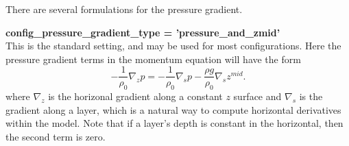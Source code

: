 There are several formulations for the pressure gradient.

{\bf config\_pressure\_gradient\_type = 'pressure\_and\_zmid'}\\
This is the standard setting, and may be used for most configurations.  Here the pressure gradient terms in the momentum equation will have the form
\begin{equation}
\label{ocean:\mode_grad p}
- \frac{1}{\rho_0}\nabla_z p = - \frac{1}{\rho_0}\nabla_s p - \frac{\rho g}{\rho_0}\nabla_s z^{mid}.
\end{equation}
where $\nabla_z$ is the horizonal gradient along a constant $z$ surface and $\nabla_s$ is the gradient along a layer, which is a natural way to compute horizontal derivatives within the model.  Note that if a layer's depth is constant in the horizontal, then the second term is zero.

